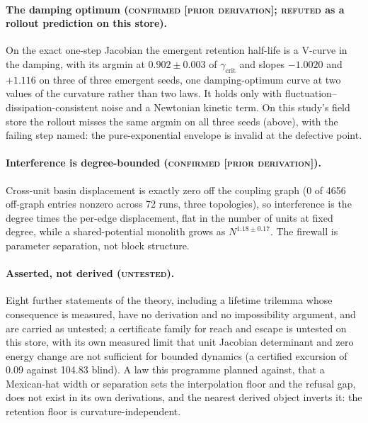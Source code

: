\documentclass{article} %
\begin{document}
\paragraph{The damping optimum (\textsc{confirmed [prior derivation]}; \textsc{refuted} as a
rollout prediction on this store).} On the exact one-step Jacobian the emergent retention
half-life is a V-curve in the damping, with its argmin at $0.902\pm0.003$ of
$\gamma_{\text{crit}}$ and slopes $-1.0020$ and $+1.116$ on three of three emergent seeds, one
damping-optimum curve at two values of the curvature rather than two laws.
It holds only with fluctuation--dissipation-consistent noise and a Newtonian kinetic term. On
this study's field store the rollout misses the same argmin on all three seeds (above), with the
failing step named: the pure-exponential envelope is invalid at the defective point.

\paragraph{Interference is degree-bounded (\textsc{confirmed [prior derivation]}).} Cross-unit
basin displacement is exactly zero off the coupling graph (0 of 4656 off-graph entries nonzero
across 72 runs, three topologies), so interference is the degree times the per-edge displacement,
flat in the number of units at fixed degree, while a shared-potential monolith grows as
$N^{1.18\pm0.17}$. The firewall is parameter separation, not block structure.

\paragraph{Asserted, not derived (\textsc{untested}).} Eight further statements of the theory,
including a lifetime trilemma whose consequence is measured, have no derivation and no
impossibility argument, and are carried as untested; a certificate family for reach and escape is
untested on this store, with its own measured limit that unit Jacobian determinant and zero
energy change are not sufficient for bounded dynamics (a certified excursion of 0.09 against
104.83 blind). %
A law this programme planned against, that a Mexican-hat width or separation sets the
interpolation floor and the refusal gap, does not exist in its own derivations, and the nearest
derived object inverts it: the retention floor is curvature-independent. %
\end{document}
